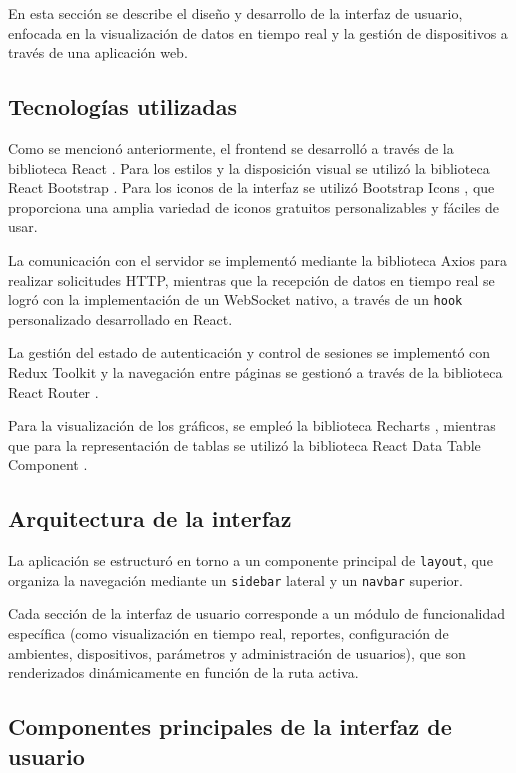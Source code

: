 En esta sección se describe el diseño y desarrollo de la interfaz de usuario,
enfocada en la visualización de datos en tiempo real y la gestión de
dispositivos a través de una aplicación web.

\subsection{Tecnologías utilizadas}

Como se mencionó anteriormente, el frontend se desarrolló a través de la
biblioteca React \cite{React}. Para los estilos y la disposición visual se
utilizó la biblioteca React Bootstrap \cite{ReactBootstrap}. Para los iconos de
la interfaz se utilizó Bootstrap Icons \cite{BootstrapIcons}, que proporciona
una amplia variedad de iconos gratuitos personalizables y fáciles de usar.

La comunicación con el servidor se implementó mediante la biblioteca Axios
\cite{Axios} para realizar solicitudes HTTP, mientras que la recepción de datos
en tiempo real se logró con la implementación de un WebSocket nativo, a través
de un \texttt{hook} personalizado desarrollado en React.

La gestión del estado de autenticación y control de sesiones se implementó con
Redux Toolkit \cite{ReduxToolkit} y la navegación entre páginas se gestionó a
través de la biblioteca React Router \cite{ReactRouter}.

Para la visualización de los gráficos, se empleó la biblioteca Recharts
\cite{Recharts}, mientras que para la representación de tablas se utilizó la
biblioteca React Data Table Component \cite{ReactDataTable}.

\subsection{Arquitectura de la interfaz}

La aplicación se estructuró en torno a un componente principal de
\texttt{layout}, que organiza la navegación mediante un \texttt{sidebar}
lateral y un \texttt{navbar} superior.

Cada sección de la interfaz de usuario corresponde a un módulo de funcionalidad
específica (como visualización en tiempo real, reportes, configuración de
ambientes, dispositivos, parámetros y administración de usuarios), que son
renderizados dinámicamente en función de la ruta activa.

\subsection{Componentes principales de la interfaz de usuario}

